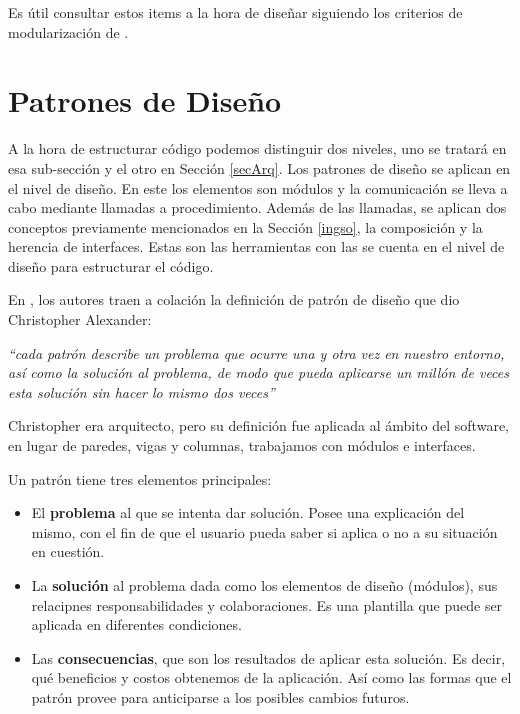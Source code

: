 Es útil consultar estos items a la hora de diseñar siguiendo los criterios de modularización de \cite{Parnas1972}.




\section{Patrones de Diseño}

A la hora de estructurar código podemos distinguir dos niveles, uno se tratará en esa sub-sección y el otro en Sección \ref{secArq}. Los patrones de diseño se aplican en el nivel de diseño. En este los elementos son módulos y la comunicación se lleva a cabo mediante llamadas a procedimiento. Además de las llamadas, se aplican dos conceptos previamente mencionados en la Sección \ref{ingso}, la composición y la herencia de interfaces. Estas son las herramientas con las se cuenta en el nivel de diseño para estructurar el código.

En \cite{Gamma:1995:DPE:186897}, los autores traen a colación la definición de patrón de diseño que dio Christopher Alexander:

\textit{``cada patrón describe un problema que ocurre una y otra vez en nuestro entorno, así como la solución al problema, de modo que pueda aplicarse un millón de veces esta solución sin hacer lo mismo dos veces''}

Christopher era arquitecto, pero su definición fue aplicada al ámbito del software, en lugar de paredes, vigas y columnas, trabajamos con módulos e interfaces.

Un patrón tiene tres elementos principales:

\begin{itemize}
	\item El \textbf{problema} al que se intenta dar solución. Posee una explicación del mismo, con el fin de que el usuario pueda saber si aplica o no a su situación en cuestión.
	\item La \textbf{solución} al problema dada como los elementos de diseño (módulos), sus relacipnes responsabilidades y colaboraciones. Es una plantilla que puede ser aplicada en diferentes condiciones.
	\item Las \textbf{consecuencias}, que son los resultados de aplicar esta solución. Es decir, qué beneficios y costos obtenemos de la aplicación. Así como las formas que el patrón provee para anticiparse a los posibles cambios futuros.
\end{itemize}

